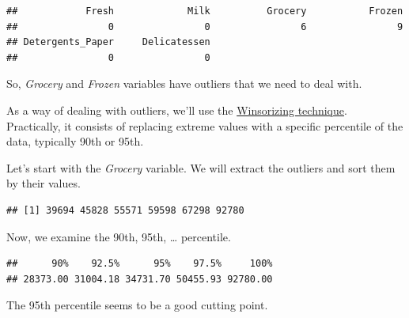 \documentclass[]{article}
\newenvironment{Shaded}{\begin{snugshade}}{\end{snugshade}}
\newcommand{\KeywordTok}[1]{\textcolor[rgb]{0.13,0.29,0.53}{\textbf{#1}}}
\newcommand{\DataTypeTok}[1]{\textcolor[rgb]{0.13,0.29,0.53}{#1}}
\newcommand{\DecValTok}[1]{\textcolor[rgb]{0.00,0.00,0.81}{#1}}
\newcommand{\FloatTok}[1]{\textcolor[rgb]{0.00,0.00,0.81}{#1}}
\newcommand{\CommentTok}[1]{\textcolor[rgb]{0.56,0.35,0.01}{\textit{#1}}}
\newcommand{\OperatorTok}[1]{\textcolor[rgb]{0.81,0.36,0.00}{\textbf{#1}}}
\newcommand{\NormalTok}[1]{#1}
\begin{document}
\begin{verbatim}
##            Fresh             Milk          Grocery           Frozen 
##                0                0                6                9 
## Detergents_Paper     Delicatessen 
##                0                0
\end{verbatim}

So, \emph{Grocery} and \emph{Frozen} variables have outliers that we
need to deal with.

As a way of dealing with outliers, we'll use the
\href{https://en.wikipedia.org/wiki/Winsorizing}{Winsorizing technique}.
Practically, it consists of replacing extreme values with a specific
percentile of the data, typically 90th or 95th.

Let's start with the \emph{Grocery} variable. We will extract the
outliers and sort them by their values.

\begin{Shaded}
\end{Shaded}

\begin{verbatim}
## [1] 39694 45828 55571 59598 67298 92780
\end{verbatim}

Now, we examine the 90th, 95th, \ldots{} percentile.

\begin{Shaded}
\end{Shaded}

\begin{verbatim}
##      90%    92.5%      95%    97.5%     100% 
## 28373.00 31004.18 34731.70 50455.93 92780.00
\end{verbatim}

The 95th percentile seems to be a good cutting point.
\end{document}

